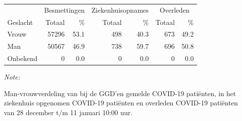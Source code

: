 \documentclass[
  english,
  man,floatsintext]{apa6}
\begin{document}
\begin{table}[H]
\centering\begingroup\fontsize{11}{13}\selectfont

\begin{threeparttable}
\begin{tabular}{lrrrrrr}
\toprule
\multicolumn{1}{c}{ } & \multicolumn{2}{c}{Besmettingen} & \multicolumn{2}{c}{Ziekenhuisopnames} & \multicolumn{2}{c}{Overleden} \\
\cmidrule(l{3pt}r{3pt}){2-3} \cmidrule(l{3pt}r{3pt}){4-5} \cmidrule(l{3pt}r{3pt}){6-7}
Geslacht & Totaal & \% & Totaal & \% & Totaal & \%\\
\midrule
Vrouw & 57296 & 53.1 & 498 & 40.3 & 673 & 49.2\\
Man & 50567 & 46.9 & 738 & 59.7 & 696 & 50.8\\
Onbekend & 0 & 0.0 & 0 & 0.0 & 0 & 0.0\\
\bottomrule
\end{tabular}
\begin{tablenotes}
\item \textit{Note: } 
\item Man-vrouwverdeling van bij de GGD’en gemelde COVID-19 patiënten, in het ziekenhuis opgenomen COVID-19 patiënten en overleden COVID-19 patiënten van 28 december t/m 11 januari 10:00 uur.
\end{tablenotes}
\end{threeparttable}
\endgroup{}
\end{table}
\newpage
\end{document}
